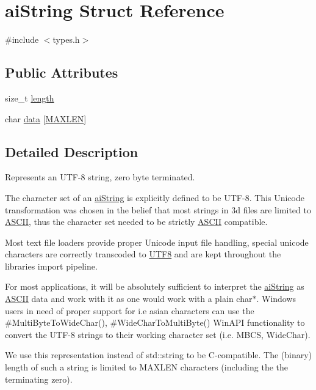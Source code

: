 \hypertarget{structai_string}{}\section{ai\+String Struct Reference}
\label{structai_string}


{\ttfamily \#include $<$types.\+h$>$}

\subsection*{Public Attributes}
\begin{DoxyCompactItemize}
\item 
size\+\_\+t \hyperlink{structai_string_a7d77c2031ff0340746aa046f7fbcf313}{length}
\item 
char \hyperlink{structai_string_aa90b1da7d347a3dcca0a95061e6ea41d}{data} \mbox{[}\hyperlink{types_8h_ae6648cd71a8bd49d58ae8ed33ba910d1}{M\+A\+X\+L\+EN}\mbox{]}
\end{DoxyCompactItemize}


\subsection{Detailed Description}
Represents an U\+T\+F-\/8 string, zero byte terminated.

The character set of an \hyperlink{structai_string}{ai\+String} is explicitly defined to be U\+T\+F-\/8. This Unicode transformation was chosen in the belief that most strings in 3d files are limited to \hyperlink{struct_a_s_c_i_i}{A\+S\+C\+II}, thus the character set needed to be strictly \hyperlink{struct_a_s_c_i_i}{A\+S\+C\+II} compatible.

Most text file loaders provide proper Unicode input file handling, special unicode characters are correctly transcoded to \hyperlink{struct_u_t_f8}{U\+T\+F8} and are kept throughout the libraries\textquotesingle{} import pipeline.

For most applications, it will be absolutely sufficient to interpret the \hyperlink{structai_string}{ai\+String} as \hyperlink{struct_a_s_c_i_i}{A\+S\+C\+II} data and work with it as one would work with a plain char$\ast$. Windows users in need of proper support for i.\+e asian characters can use the \#\+Multi\+Byte\+To\+Wide\+Char(), \#\+Wide\+Char\+To\+Multi\+Byte() Win\+A\+PI functionality to convert the U\+T\+F-\/8 strings to their working character set (i.\+e. M\+B\+CS, Wide\+Char).

We use this representation instead of std\+::string to be C-\/compatible. The (binary) length of such a string is limited to M\+A\+X\+L\+EN characters (including the the terminating zero). 

